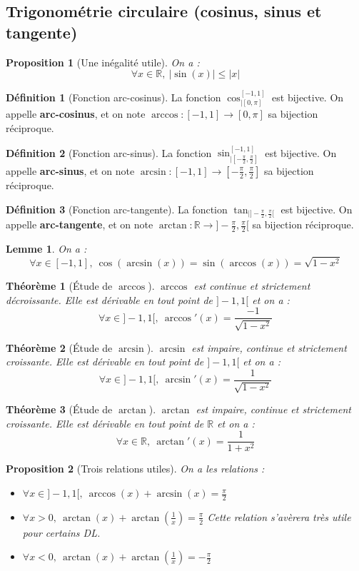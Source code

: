 \documentclass[french]{book}
\newcommand{\R}{\mathbb{R}}
\theoremstyle{plain}
\newtheorem{thm}{Théorème}[chapter]
\newtheorem{lem}{Lemme}[chapter]
\newtheorem{prop}{Proposition}[chapter]
\theoremstyle{definition}
\newtheorem{dfn}{Définition}[chapter]
\theoremstyle{remark}
\begin{document}
\subsection{Trigonométrie circulaire (cosinus, sinus et tangente)}
\begin{prop}[Une inégalité utile]
	On a : $$\forall x\in\R,\ \lvert\sin(x)\rvert\leqslant\lvert x\rvert$$
\end{prop}
\begin{dfn}[Fonction arc-cosinus]
	La fonction $\cos_{|[0,\pi]}^{[-1,1]}$ est bijective. On appelle \textbf{arc-cosinus}, et on note $\arccos:[-1,1]\rightarrow[0,\pi]$ sa bijection réciproque.
\end{dfn}
\begin{dfn}[Fonction arc-sinus]
	La fonction $\sin_{|[-\frac{\pi}{2},\frac{\pi}{2}]}^{[-1,1]}$ est bijective. On appelle \textbf{arc-sinus}, et on note $\arcsin:[-1,1]\rightarrow[-\frac{\pi}{2},\frac{\pi}{2}]$ sa bijection réciproque.
\end{dfn}
\begin{dfn}[Fonction arc-tangente]
	La fonction $\tan_{|]-\frac{\pi}{2},\frac{\pi}{2}[}$ est bijective. On appelle \textbf{arc-tangente}, et on note $\arctan:\R\rightarrow]-\frac{\pi}{2},\frac{\pi}{2}[$ sa bijection réciproque.
\end{dfn}
\begin{lem}
	On a : $$\forall x\in[-1,1],\ \cos(\arcsin(x))=\sin(\arccos(x))=\sqrt{1-x^2}$$
\end{lem}
\begin{thm}[Étude de $\arccos$]
	$\arccos$ est continue et strictement décroissante. Elle est dérivable en tout point de $]-1,1[$ et on a : $$\forall x\in]-1,1[,\ \arccos'(x)=\frac{-1}{\sqrt{1-x^2}}$$
\end{thm}
\begin{thm}[Étude de $\arcsin$]
	$\arcsin$ est impaire, continue et strictement croissante. Elle est dérivable en tout point de $]-1,1[$ et on a : $$\forall x\in]-1,1[,\ \arcsin'(x)=\frac{1}{\sqrt{1-x^2}}$$
\end{thm}
\begin{thm}[Étude de $\arctan$]
	$\arctan$ est impaire, continue et strictement croissante. Elle est dérivable en tout point de $\R$ et on a : $$\forall x\in\R,\ \arctan'(x)=\frac{1}{1+x^2}$$
\end{thm}
\begin{prop}[Trois relations utiles]
	On a les relations :\begin{itemize}
		\item $\forall x\in ]-1,1[,\ \arccos(x)+\arcsin(x)=\displaystyle\frac{\pi}{2}$
		\item $\displaystyle\forall x>0,\ \arctan(x)+\arctan\left(\frac{1}{x}\right)=\frac{\pi}{2}$ Cette relation s'avèrera très utile pour certains DL.
		\item $\displaystyle\forall x<0,\ \arctan(x)+\arctan\left(\frac{1}{x}\right)=-\frac{\pi}{2}$
	\end{itemize}
\end{prop}
\end{document}

